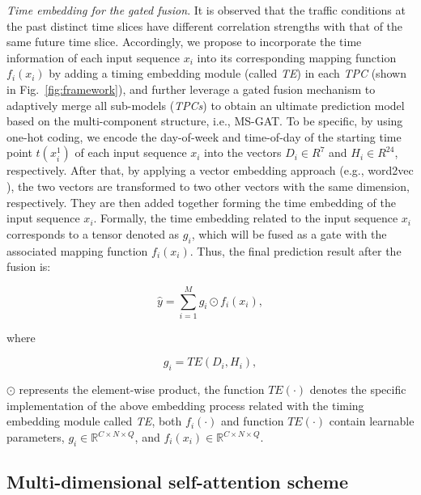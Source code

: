 \textit{Time embedding for the gated fusion}. 
It is observed that the traffic conditions at the past distinct time slices have different correlation strengths with that of the same future time slice. Accordingly, we propose to incorporate the time information of each input sequence $x_i$ into its corresponding mapping function $f_i(x_i)$ by adding a timing embedding module (called \textit{TE}) in each \textit{TPC} (shown in Fig.~\ref{fig:framework}), and further leverage a gated fusion mechanism to adaptively merge all sub-models (\textit{TPCs}) to obtain an ultimate prediction model based on the multi-component structure, i.e., MS-GAT. To be specific, by using one-hot coding, we encode the day-of-week and time-of-day of the starting time point $t(x_i^1)$ of each input sequence $x_i$ into the vectors $D_i \in R^7$ and $H_i \in R^{24}$, respectively. After that, by applying a vector embedding approach (e.g., word2vec \cite{church2017word2vec}), the two vectors are transformed to two other vectors with the same dimension, respectively. They are then added together forming the time embedding of the input sequence $x_i$. Formally, the time embedding related to the input sequence $x_i$ corresponds to a tensor denoted as $g_i$, which will be fused as a gate with the associated mapping function $f_i(x_i)$. Thus, the final prediction result after the fusion is:

\begin{equation}
    \label{eqn:gate_fusion}
    \hat{y} = \sum\limits_{i=1}^{M}g_i \odot f_i(x_i),
\end{equation}

where

\begin{equation}
    \label{eqn:time_embedding}
    g_i = TE(D_i, H_i),
\end{equation}

$\odot$ represents the element-wise product, the function $TE(\cdot)$ denotes the specific implementation of the above embedding process related with the timing embedding module called \textit{TE}, both $f_i(\cdot)$ and function $TE(\cdot)$ contain learnable parameters, $g_i \in \mathbb{R}^{C \times N \times Q}$, and $f_i(x_i) \in \mathbb{R}^{C \times N \times Q}$.

\subsection{Multi-dimensional self-attention scheme}
\label{ssec:multi-dimensional_self-attention_scheme}


